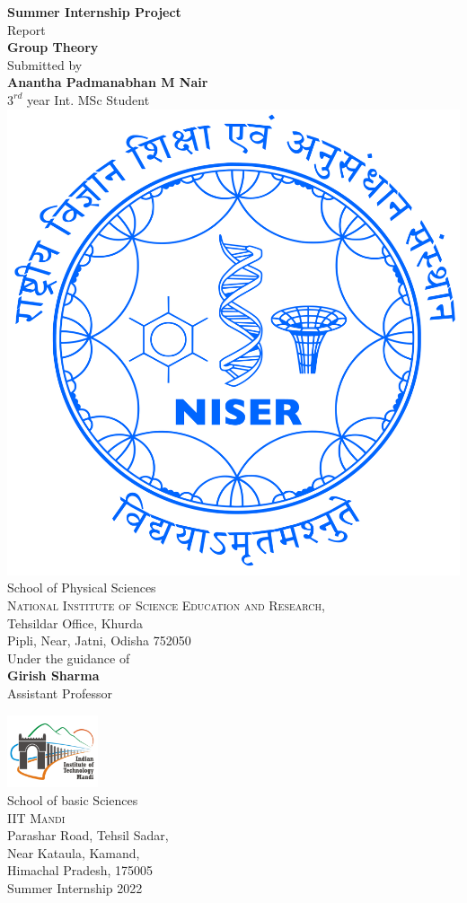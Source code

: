 


\begin{titlepage}

\begin{center}



\textup{\Large {\bf Summer Internship Project} \\ Report}\\[0.3in]

\Large \textbf {Group Theory}\\[0.7in]


       

\normalsize Submitted by \\[0.2in]
\textbf{Anantha Padmanabhan M Nair}\\
\normalsize
$3^{rd}$ year Int. MSc Student\\

\includegraphics[width=0.25 \textwidth]{NISER.png}\\[0.1in]
\Large{School of Physical Sciences}\\
\normalsize
\textsc{National Institute of Science Education and Research},\\
Tehsildar Office, Khurda\\
Pipli, Near, Jatni, Odisha 752050\\





\vspace{.2in}
Under the guidance of\\[0.2in]
\textbf{Girish Sharma}\\
Assistant Professor



\vspace{.3in}

\includegraphics[width=0.2\textwidth]{IIT.png}\\[0.1in]
\Large{School of basic Sciences}\\
\normalsize
\textsc{IIT Mandi}\\
Parashar Road, Tehsil Sadar, \\Near Kataula, Kamand, \\Himachal Pradesh, 175005 \\
\vspace{0.2cm}
Summer Internship 2022

\end{center}

\end{titlepage}
